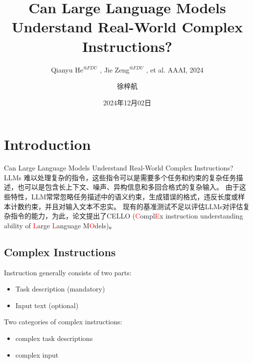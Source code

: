 \documentclass{beamer}
\author{徐梓航}
\title{Can Large Language Models Understand Real-World Complex Instructions?}
\subtitle{
    \scriptsize
    Qianyu He\scriptsize\texorpdfstring{$^{@FDU}$}{\textit{@FDU}}
    \normalfont
    , Jie Zeng\scriptsize\texorpdfstring{$^{@FDU}$}{\textit{@FDU}}
    \normalfont
    , et al. AAAI, 2024
}
\institute{华中科技大学计算机科学与技术学院}
\date{2024年12月02日}
\begin{document}

\begin{frame}
    \titlepage
    \begin{figure}[htpb]
    \end{figure}
\end{frame}

\begin{frame}
    \tableofcontents[sectionstyle=show,subsectionstyle=show/shaded/hide,subsubsectionstyle=show/shaded/hide]
\end{frame}

\section{Introduction}

\begin{frame}{Can Large Language Models Understand Real-World Complex Instructions?}
    LLMs 难以处理复杂的指令，这些指令可以是需要多个任务和约束的复杂任务描述，也可以是包含长上下文、噪声、异构信息和多回合格式的复杂输入。
    \newline
    \newline
    由于这些特性，LLM常常忽略任务描述中的语义约束，生成错误的格式，违反长度或样本计数约束，并且对输入文本不忠实。
    \newline
    \newline
    现有的基准测试不足以评估LLMs对评估复杂指令的能力，为此，论文提出了CELLO (\textcolor{red}{C}ompl\textcolor{red}{E}x instruction understanding ability of \textcolor{red}{L}arge \textcolor{red}{L}anguage M\textcolor{red}{O}dels)。
\end{frame}

\subsection{Complex Instructions}

\begin{frame}
    Instruction generally consists of two parts:
    \begin{itemize}
        \item {Task description (mandatory)}
        \item {Input text (optional)}
    \end{itemize}

    Two categories of complex instructions:
    \begin{itemize}
        \item {complex task descriptions}
        \item {complex input}
    \end{itemize}
\end{frame}
\end{document}
